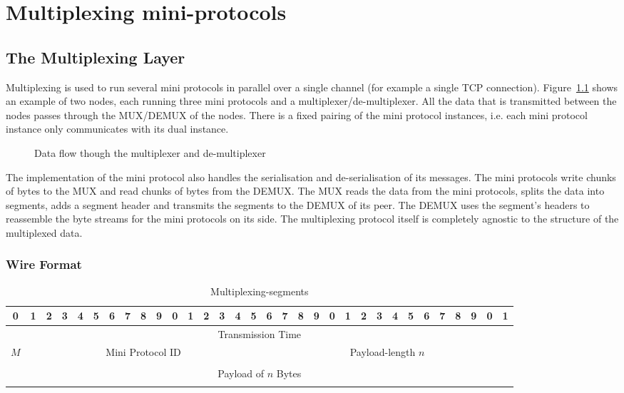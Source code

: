 \chapter{Multiplexing mini-protocols}
\label{connection-management}

\section{The Multiplexing Layer}
\label{multiplexing-section}
Multiplexing is used to run several mini protocols in parallel over a single
channel (for example a single TCP connection).
Figure~\ref{mux-diagram} shows an example of two nodes, each running three
mini protocols and a multiplexer/de-multiplexer.
All the data that is transmitted between the nodes passes through the MUX/DEMUX of the nodes.
There is a fixed pairing of the mini protocol instances, i.e. each mini protocol instance only
communicates with its dual instance.

\begin{figure}[ht]
\begin{center}
\end{center}
\caption{Data flow though the multiplexer and de-multiplexer}
\label{mux-diagram}
\end{figure}

The implementation of the mini protocol also handles the serialisation and de-serialisation of its messages.
The mini protocols write chunks of bytes to the MUX and read chunks of bytes from the DEMUX.
The MUX reads the data from the mini protocols, splits the data into segments, adds a segment header
and transmits the segments to the DEMUX of its peer.
The DEMUX uses the segment's headers to reassemble the byte streams for the mini protocols on its side.
The multiplexing protocol itself is completely agnostic to the structure of the multiplexed data.

\subsection{Wire Format}
\begin{table}[ht]
\centering
\begingroup
\setlength{\tabcolsep}{3pt}
\begin{tabular}{|c|c|c|c|c|c|c|c|c|c|c|c|c|c|c|c|c|c|c|c|c|c|c|c|c|c|c|c|c|c|c|c|}
  \hline
  0&1&2&3&4&5&6&7&8&9&0&1&2&3&4&5&6&7&8&9&0&1&2&3&4&5&6&7&8&9&0&1 \\ \hline
  \multicolumn{32}{|c|}{Transmission Time} \\ \hline
  \multicolumn{1}{|c|}{$M$}
  &\multicolumn{15}{|c|}{Mini Protocol ID}
  &\multicolumn{16}{|c|}{Payload-length $n$} \\ \hline
  \multicolumn{32}{|c|}{} \\
  \multicolumn{32}{|c|}{Payload of $n$ Bytes} \\
  \multicolumn{32}{|c|}{} \\ \hline
\end{tabular}
\endgroup
\caption{Multiplexing-segments}
\label{segment-header}
\end{table}

